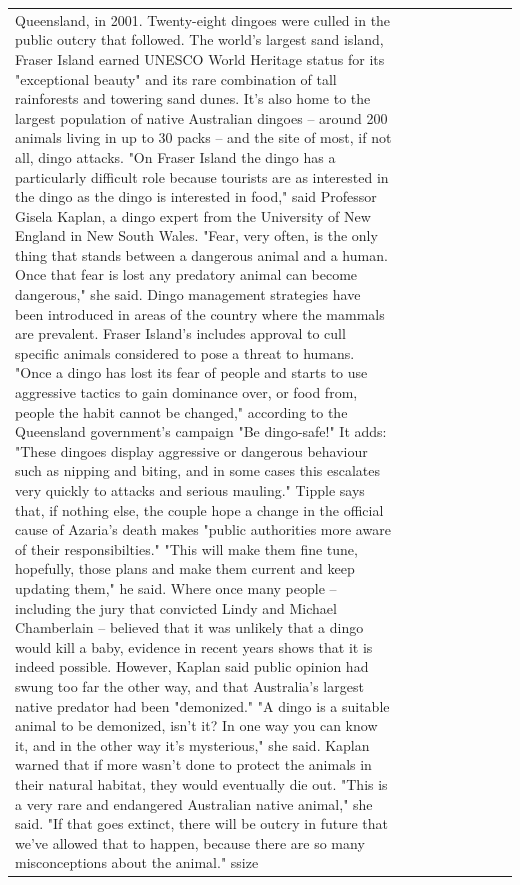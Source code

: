 \begin{table}[H]
\begin{tabular}{lllrlllll}
Queensland, in 2001. Twenty-eight dingoes were culled in the public outcry that followed. The world's largest sand island, Fraser Island earned UNESCO World Heritage status for its "exceptional beauty" and its rare combination of tall rainforests and towering sand dunes. It's also home to the largest population of native Australian dingoes -- around 200 animals living in up to 30 packs -- and the site of most, if not all, dingo attacks. "On Fraser Island the dingo has a particularly difficult role because tourists are as interested in the dingo as the dingo is interested in food," said Professor Gisela Kaplan, a dingo expert from the University of New England in New South Wales. "Fear, very often, is the only thing that stands between a dangerous animal and a human. Once that fear is lost any predatory animal can become dangerous," she said. Dingo management strategies have been introduced in areas of the country where the mammals are prevalent. Fraser Island's includes approval to cull specific animals considered to pose a threat to humans. "Once a dingo has lost its fear of people and starts to use aggressive tactics to gain dominance over, or food from, people the habit cannot be changed," according to the Queensland government's campaign "Be dingo-safe!" It adds: "These dingoes display aggressive or dangerous behaviour such as nipping and biting, and in some cases this escalates very quickly to attacks and serious mauling." Tipple says that, if nothing else, the couple hope a change in the official cause of Azaria's death makes "public authorities more aware of their responsibilties." "This will make them fine tune, hopefully, those plans and make them current and keep updating them," he said. Where once many people -- including the jury that convicted Lindy and Michael Chamberlain -- believed that it was unlikely that a dingo would kill a baby, evidence in recent years shows that it is indeed possible. However, Kaplan said public opinion had swung too far the other way, and that Australia's largest native predator had been "demonized." "A dingo is a suitable animal to be demonized, isn't it? In one way you can know it, and in the other way it's mysterious," she said. Kaplan warned that if more wasn't done to protect the animals in their natural habitat, they would eventually die out. "This is a very rare and endangered Australian native animal," she said. "If that goes extinct, there will be outcry in future that we've allowed that to happen, because there are so many misconceptions about the animal." ssize \\

\end{tabular}
\end{table}
